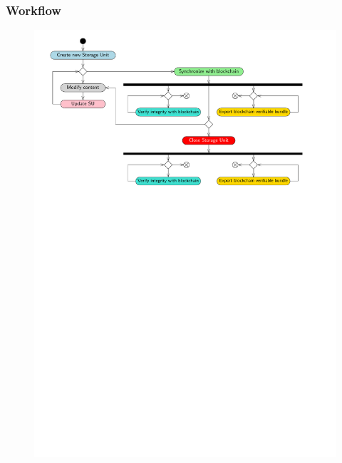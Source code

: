 \documentclass{beamer}
\begin{document}
\begin{frame}
	\frametitle{Workflow}
	\centering
	\begin{figure}
		\includegraphics[width=\textwidth]{figures/activityDiag.pdf}
	\end{figure}
\end{frame}

\end{document}
